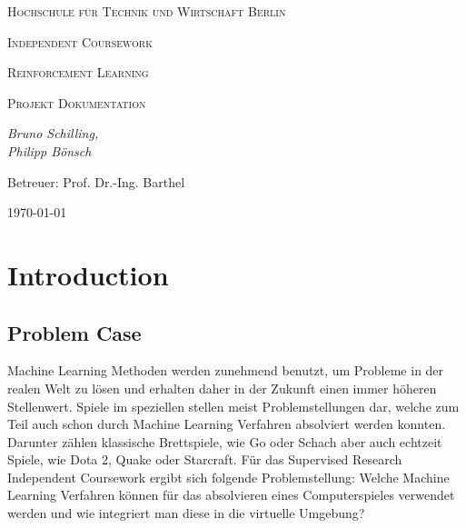 \documentclass[11pt]{scrartcl}
\begin{document}

\begin{titlepage}
	\centering
	{\scshape\LARGE Hochschule für Technik und Wirtschaft Berlin \par}
	\vspace{2cm}
	{\Huge \scshape{Independent Coursework}\par}
	\vspace{2cm}
	{\LARGE \scshape{Reinforcement Learning}\par}
	{\scshape\Large Projekt Dokumentation\par}
	\vspace{4cm}
	{\large\itshape Bruno Schilling,\\Philipp Bönsch\par}
	\vfill
	
	{\large Betreuer: Prof. Dr.-Ing. Barthel \par}
	\vspace{1cm}
	{\large \today\par}
\end{titlepage}

\lstset{basicstyle=\ttfamily\small,breaklines=true}
\newpage
\tableofcontents
\newpage
\section{Introduction}

\subsection{Problem Case}
Machine Learning Methoden werden zunehmend benutzt, um Probleme in der realen Welt zu
lösen und erhalten daher in der Zukunft einen immer höheren Stellenwert. Spiele im
speziellen stellen meist Problemstellungen dar, welche zum Teil auch schon durch Machine
Learning Verfahren absolviert werden konnten. Darunter zählen klassische Brettspiele, wie Go
oder Schach\cite{DM2018} aber auch echtzeit Spiele, wie Dota 2\cite{OA2019},
Quake\cite{DM2019} oder Starcraft\cite{DM2019_2}. Für das Supervised Research Independent Coursework
ergibt sich folgende Problemstellung: Welche Machine Learning Verfahren können für das
absolvieren eines Computerspieles verwendet werden und wie integriert man diese in die
virtuelle Umgebung?
\end{document}
